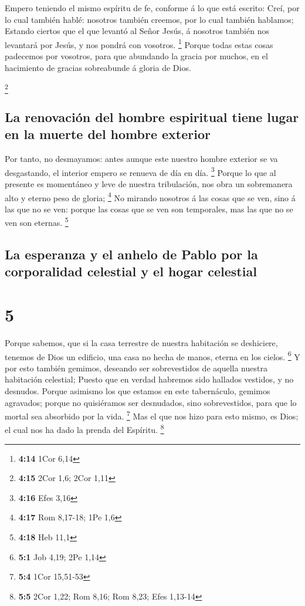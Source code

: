  Empero teniendo el mismo espíritu de fe, conforme á lo
que está escrito: Creí, por lo cual también hablé: nosotros también
creemos, por lo cual también hablamos;  Estando ciertos
que el que levantó al Señor Jesús, á nosotros también nos levantará por
Jesús, y nos pondrá con vosotros. \footnote{\textbf{4:14} 1Cor 6,14}
 Porque todas estas cosas padecemos por vosotros, para
que abundando la gracia por muchos, en el hacimiento de gracias
sobreabunde á gloria de Dios.

\footnote{\textbf{4:15} 2Cor 1,6; 2Cor 1,11}

\hypertarget{la-renovaciuxf3n-del-hombre-espiritual-tiene-lugar-en-la-muerte-del-hombre-exterior}{%
\subsection{La renovación del hombre espiritual tiene lugar en la muerte
del hombre
exterior}\label{la-renovaciuxf3n-del-hombre-espiritual-tiene-lugar-en-la-muerte-del-hombre-exterior}}

 Por tanto, no desmayamos: antes aunque este nuestro
hombre exterior se va desgastando, el interior empero se renueva de día
en día. \footnote{\textbf{4:16} Efes 3,16}  Porque lo que
al presente es momentáneo y leve de nuestra tribulación, nos obra un
sobremanera alto y eterno peso de gloria; \footnote{\textbf{4:17} Rom
  8,17-18; 1Pe 1,6}  No mirando nosotros á las cosas que
se ven, sino á las que no se ven: porque las cosas que se ven son
temporales, mas las que no se ven son eternas. \footnote{\textbf{4:18}
  Heb 11,1}

\hypertarget{la-esperanza-y-el-anhelo-de-pablo-por-la-corporalidad-celestial-y-el-hogar-celestial}{%
\subsection{La esperanza y el anhelo de Pablo por la corporalidad
celestial y el hogar
celestial}\label{la-esperanza-y-el-anhelo-de-pablo-por-la-corporalidad-celestial-y-el-hogar-celestial}}

\hypertarget{section-4}{%
\section{5}\label{section-4}}

 Porque sabemos, que si la casa terrestre de nuestra
habitación se deshiciere, tenemos de Dios un edificio, una casa no hecha
de manos, eterna en los cielos. \footnote{\textbf{5:1} Job 4,19; 2Pe
  1,14}  Y por esto también gemimos, deseando ser
sobrevestidos de aquella nuestra habitación celestial; 
Puesto que en verdad habremos sido hallados vestidos, y no desnudos.
 Porque asimismo los que estamos en este tabernáculo,
gemimos agravados; porque no quisiéramos ser desnudados, sino
sobrevestidos, para que lo mortal sea absorbido por la vida. \footnote{\textbf{5:4}
  1Cor 15,51-53}  Mas el que nos hizo para esto mismo, es
Dios; el cual nos ha dado la prenda del Espíritu. \footnote{\textbf{5:5}
  2Cor 1,22; Rom 8,16; Rom 8,23; Efes 1,13-14}


